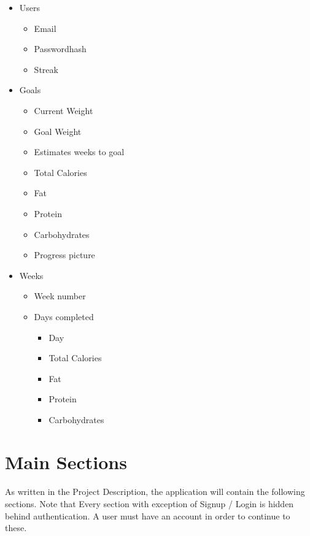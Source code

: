 \documentclass{article}
\begin{document}
        \begin{itemize}
          \item Users
            \begin{itemize}
                \item Email
                \item Passwordhash
                \item Streak
            \end{itemize}
            \hfill \break
          \item Goals
            \begin{itemize}
                \item Current Weight
                \item Goal Weight
                \item Estimates weeks to goal
                \item Total Calories
                \item Fat
                \item Protein
                \item Carbohydrates
                \item Progress picture
            \end{itemize}
            \hfill \break
          \item Weeks
            \begin{itemize}
                \item Week number
                \item Days completed
                    \begin{itemize}
                        \item Day
                        \item Total Calories
                        \item Fat
                        \item Protein
                        \item Carbohydrates
                    \end{itemize}
            \end{itemize}
        \end{itemize}

    \newpage

    \section{Main Sections}
        \paragraph{}
        As written in the Project Description, the application will contain the following sections. 
        Note that Every section with exception of Signup / Login is hidden behind authentication. A user must have an account in order to continue to these.
\end{document}
